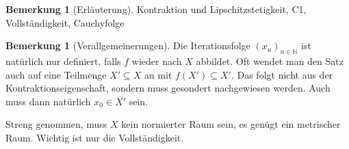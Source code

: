\documentclass[index=totoc]{scrartcl}%
\theoremstyle{definition}
\newtheorem{bem}[defi]{Bemerkung}
\newcommand{\N}{\mathbb N}
\begin{document}
\begin{bem}[Erläuterung]
  Kontraktion und Lipschitzstetigkeit, C1,
  Vollständigkeit, Cauchyfolge
\end{bem}

\begin{bem}[Verallgemeinerungen]
Die Iterationsfolge $(x_n)_{n\in\N}$
ist natürlich nur definiert, falls $f$ wieder nach $X$ abbildet.
Oft wendet man den Satz auch auf eine Teilmenge $X'\subseteq X$ an
mit $f(X')\subseteq X'$.
Das folgt nicht aus der Kontraktionseigenschaft,
sondern muss gesondert nachgewiesen werden.
Auch muss dann natürlich $x_0\in X'$ sein. 

Streng genommen, muss $X$ kein normierter Raum sein,
es genügt ein metrischer Raum.
Wichtig ist nur die Vollständigkeit. 
\end{bem}
\end{document}
